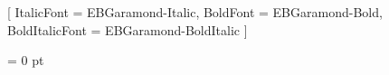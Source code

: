 
\usepackage{hyperref}
\hypersetup{
  pdfborder=false
}


\usepackage[babelshorthands]{polyglossia}
\setmainlanguage[indentfirst=true]{russian}


\setstocksize{297mm}{210mm}
\settrimmedsize{\stockheight}{\stockwidth}{*}
\settypeblocksize{52pc}{28pc}{*}
\setlrmargins{11pc}{*}{*}
\setulmargins{7pc}{*}{*}
\checkandfixthelayout


\pagestyle{mystyle}


\usepackage{fontspec}


\setmainfont{EBGaramond-Regular}[
	ItalicFont = EBGaramond-Italic,
	BoldFont = EBGaramond-Bold,
	BoldItalicFont = EBGaramond-BoldItalic
]


\parskip = 0 pt %

\usepackage[symbol]{footmisc}
\renewcommand{\thefootnote}{\fnsymbol{footnote}}


